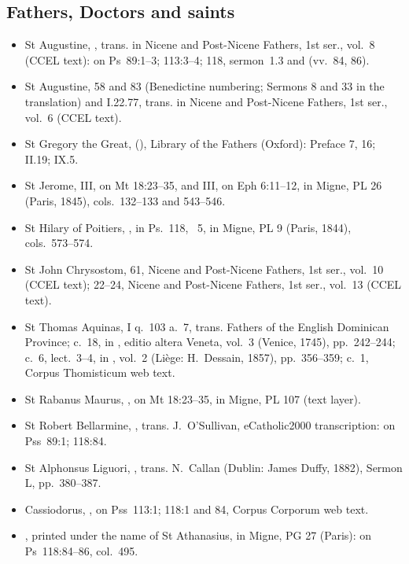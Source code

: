 {\subsection*{Fathers, Doctors and saints}
\begin{itemize}\setlength{\itemsep}{0.15em}\setlength{\parskip}{0pt}
\item St Augustine, , trans. in Nicene and Post-Nicene Fathers, 1st ser., vol.~8 (CCEL text): on Ps~89:1--3; 113:3--4; 118, sermon~1.3 and  (vv.~84, 86).
\item St Augustine,  58 and 83 (Benedictine numbering; Sermons 8 and 33 in the translation) and  I.22.77, trans. in Nicene and Post-Nicene Fathers, 1st ser., vol.~6 (CCEL text).
\item St Gregory the Great,  (), Library of the Fathers (Oxford): Preface 7, 16; II.19; IX.5.
\item St Jerome,  III, on Mt 18:23--35, and  III, on Eph 6:11--12, in Migne, PL 26 (Paris, 1845), cols.~132--133 and 543--546.
\item St Hilary of Poitiers, , in Ps.~118, ~5, in Migne, PL 9 (Paris, 1844), cols.~573--574.
\item St John Chrysostom,  61, Nicene and Post-Nicene Fathers, 1st ser., vol.~10 (CCEL text);  22--24, Nicene and Post-Nicene Fathers, 1st ser., vol.~13 (CCEL text).
\item St Thomas Aquinas,  I q.~103 a.~7, trans. Fathers of the English Dominican Province;  c.~18, in , editio altera Veneta, vol.~3 (Venice, 1745), pp.~242--244;  c.~6, lect.~3--4, in , vol.~2 (Li\`ege: H.~Dessain, 1857), pp.~356--359;  c.~1, Corpus Thomisticum web text.
\item St Rabanus Maurus, , on Mt 18:23--35, in Migne, PL 107 (text layer).
\item St Robert Bellarmine, , trans. J.~O'Sullivan, eCatholic2000 transcription: on Pss~89:1; 118:84.
\item St Alphonsus Liguori, , trans. N.~Callan (Dublin: James Duffy, 1882), Sermon L, pp.~380--387.
\item Cassiodorus, , on Pss~113:1; 118:1 and 84, Corpus Corporum web text.
\item {}, printed under the name of St Athanasius, in Migne, PG 27 (Paris): on Ps~118:84--86, col.~495.
\end{itemize}

}
